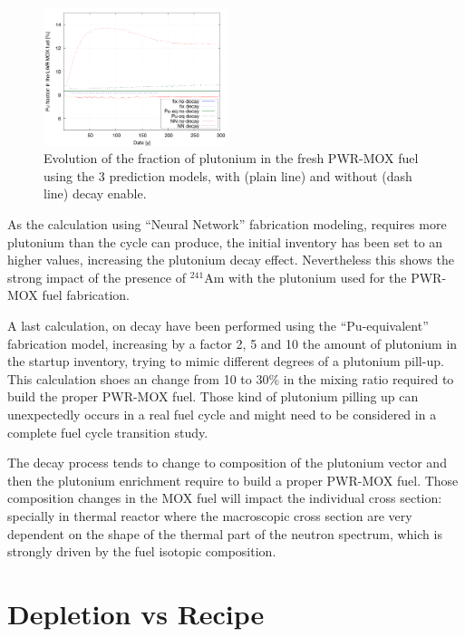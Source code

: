\documentclass{anstrans}
\begin{document}
\begin{figure}[ht] %
  \centering 
  \includegraphics[width=0.48\textwidth]{decay_pu_contribution.png}
  \caption{Evolution of the fraction of plutonium in the fresh PWR-MOX fuel
    using the 3 prediction models, with (plain line) and without (dash line)
    decay enable.}
  \label{fig:d} 
\end{figure}

As the calculation using ``Neural Network'' fabrication modeling, requires more
plutonium than the cycle can produce, the initial inventory has been set to an
higher values, increasing the plutonium decay effect. Nevertheless this shows
the strong impact of the presence of $^{241}$Am with the plutonium used for the
PWR-MOX fuel fabrication.

A last calculation, on decay have been performed using the ``Pu-equivalent''
fabrication model, increasing by a factor 2, 5 and 10 the amount of plutonium in
the startup inventory, trying to mimic different degrees of a plutonium pill-up.
This calculation shoes an change from 10 to 30\% in the mixing ratio required to
build the proper PWR-MOX fuel. Those kind of plutonium pilling up can
unexpectedly occurs in a real fuel cycle and might need to be considered in a
complete fuel cycle transition study.

The decay process tends to change to composition of the plutonium vector and
then the plutonium enrichment require to build a proper PWR-MOX fuel. Those
composition changes in the MOX fuel will impact the individual cross section:
specially in thermal reactor where the macroscopic cross section are very
dependent on the shape of the thermal part of the neutron spectrum, which is
strongly driven by the fuel isotopic composition.


\section{Depletion vs Recipe}
\end{document}
